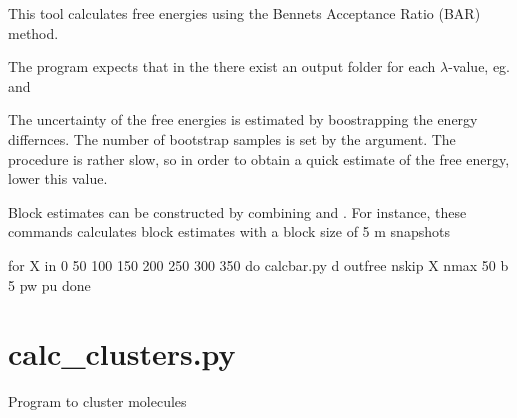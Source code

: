 \documentclass[letterpaper,10pt,english]{sphinxmanual}
\begin{document}

This tool calculates free energies using the Bennets Acceptance Ratio (BAR) method.

The program expects that in the  there exist an output folder for each \(\lambda\)-value, eg.  and 

The uncertainty of the free energies is estimated by boostrapping the energy differnces. The number of bootstrap samples is set by the  argument. The procedure is rather slow, so in order to obtain a quick estimate of the free energy, lower this value.

Block estimates can be constructed by combining  and . For instance, these commands calculates block estimates with a block size of 5 m snapshots

%
\begin{sphinxVerbatim}[commandchars=\\\{\}]
for X in 0 50 100 150 200 250 300 350
do
calc\PYGZus{}bar.py \PYGZhy{}d out\PYGZus{}free \PYGZhy{}nskip \PYGZdl{}X \PYGZhy{}nmax 50 \PYGZhy{}b 5 \PYGZhy{}pw \PYGZhy{}pu
done
\end{sphinxVerbatim}


\section{calc\_clusters.py}
\label{\detokenize{tools:calc-clusters-py}}

Program to cluster molecules


%
\begin{sphinxVerbatim}[commandchars=\\\{\}]
  \PYG{p}{[}\PYG{p}{]} \PYG{p}{[}  \PYG{p}{[} \PYG{p}{]}\PYG{p}{]} \PYG{p}{[} \PYG{p}{]} \PYG{p}{[} \PYG{p}{]}
                        \PYG{p}{[} \PYG{p}{]}
                        \PYG{p}{[} \PYG{p}{]}
                        \PYG{p}{[} \PYG{p}{]} \PYG{p}{[} \PYG{p}{]} \PYG{p}{[} \PYG{p}{]}
\end{sphinxVerbatim}
\end{document}
